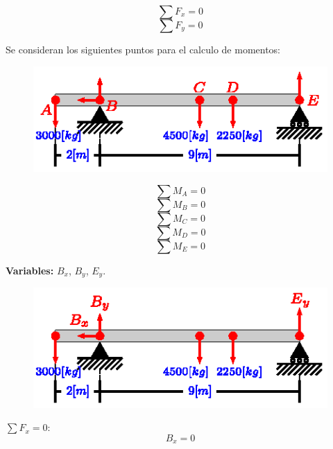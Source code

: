 \documentclass[letter,10pt,twoside]{article}
\begin{document}
\begin{equation*}
    \sum{F_x} = 0
\end{equation*}
\begin{equation*}
    \sum{F_y} = 0
\end{equation*}

Se consideran los siguientes puntos para el calculo de momentos:

\begin{figure}[H]
\centering
\includegraphics[scale=1.8]{resources/g08.eps}
\end{figure}

\begin{equation*}
    \sum{M_A} = 0
\end{equation*}
\begin{equation*}
    \sum{M_B} = 0
\end{equation*}
\begin{equation*}
    \sum{M_C} = 0
\end{equation*}
\begin{equation*}
    \sum{M_D} = 0
\end{equation*}
\begin{equation*}
    \sum{M_E} = 0
\end{equation*}

\textbf{Variables:} $B_x$, $B_y$, $E_y$.
\\

\begin{figure}[H]
\centering
\includegraphics[scale=1.8]{resources/h08.eps}
\end{figure}

$\sum{F_x} = 0$:
\begin{equation*}
    B_x = 0
\end{equation*}
\end{document}
